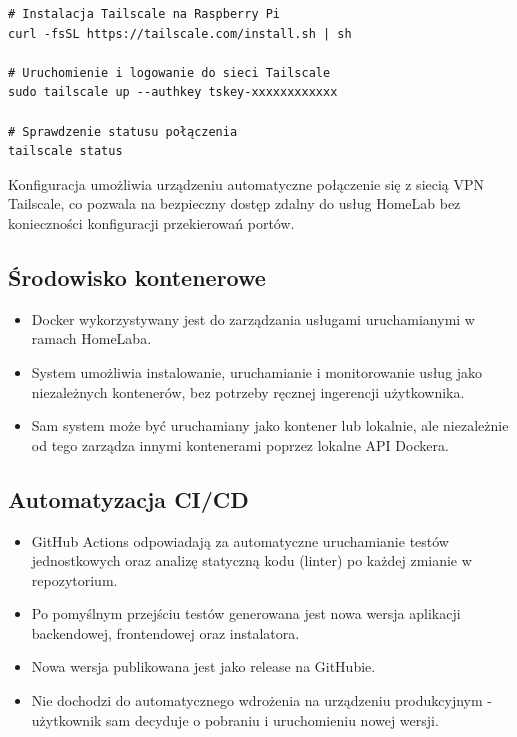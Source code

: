 \begin{verbatim}
# Instalacja Tailscale na Raspberry Pi
curl -fsSL https://tailscale.com/install.sh | sh

# Uruchomienie i logowanie do sieci Tailscale
sudo tailscale up --authkey tskey-xxxxxxxxxxxx

# Sprawdzenie statusu połączenia
tailscale status
\end{verbatim}

Konfiguracja umożliwia urządzeniu automatyczne połączenie się z siecią VPN Tailscale, co pozwala na bezpieczny dostęp zdalny do usług HomeLab bez konieczności konfiguracji przekierowań portów.

\subsection{Środowisko kontenerowe}
\begin{itemize}
    \item Docker wykorzystywany jest do zarządzania usługami uruchamianymi w ramach HomeLaba.
    \item System umożliwia instalowanie, uruchamianie i monitorowanie usług jako niezależnych kontenerów, bez potrzeby ręcznej ingerencji użytkownika.
    \item Sam system może być uruchamiany jako kontener lub lokalnie, ale niezależnie od tego zarządza innymi kontenerami poprzez lokalne API Dockera.
\end{itemize}

\subsection{Automatyzacja CI/CD}
\begin{itemize}
    \item GitHub Actions odpowiadają za automatyczne uruchamianie testów jednostkowych oraz analizę statyczną kodu (linter) po każdej zmianie w repozytorium.
    \item Po pomyślnym przejściu testów generowana jest nowa wersja aplikacji backendowej, frontendowej oraz instalatora.
    \item Nowa wersja publikowana jest jako release na GitHubie.
    \item Nie dochodzi do automatycznego wdrożenia na urządzeniu produkcyjnym - użytkownik sam decyduje o pobraniu i uruchomieniu nowej wersji.
\end{itemize}

